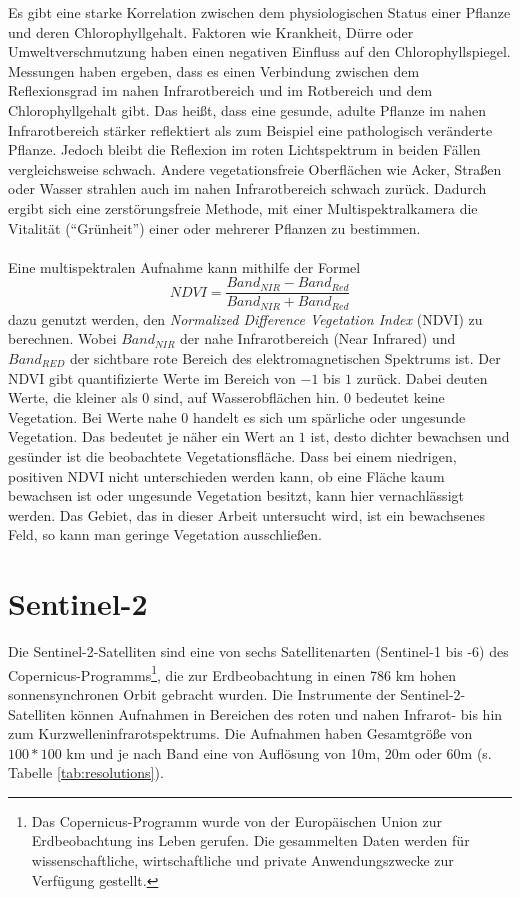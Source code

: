 Es gibt eine starke Korrelation zwischen dem physiologischen Status einer Pflanze und deren Chlorophyllgehalt. Faktoren wie Krankheit, Dürre oder Umweltverschmutzung haben einen negativen Einfluss auf den Chlorophyllspiegel.\cite{ref:hendry} Messungen haben ergeben, dass es einen Verbindung zwischen dem Reflexionsgrad im nahen Infrarotbereich und im Rotbereich und dem Chlorophyllgehalt gibt. Das heißt, dass eine gesunde, adulte Pflanze im nahen Infrarotbereich stärker reflektiert als zum Beispiel eine pathologisch veränderte Pflanze. Jedoch bleibt die Reflexion im roten Lichtspektrum in beiden Fällen vergleichsweise schwach. Andere vegetationsfreie Oberflächen wie Acker, Straßen oder Wasser strahlen auch im nahen Infrarotbereich schwach zurück. Dadurch ergibt sich eine zerstörungsfreie Methode, mit einer Multispektralkamera die Vitalität ("`Grünheit"') einer oder mehrerer Pflanzen zu bestimmen.\cite{ref:anatoly} \\\\
Eine multispektralen Aufnahme kann mithilfe der Formel 
\begin{equation}\label{equation:ndvi}
	NDVI = \frac{Band_{NIR} - Band_{Red}} {Band_{NIR} + Band_{Red}}
\end{equation}
dazu genutzt werden, den \textit{Normalized Difference Vegetation Index} (NDVI) zu berechnen. Wobei $Band_{NIR}$ der nahe Infrarotbereich (Near Infrared) und $Band_{RED}$ der sichtbare rote Bereich des elektromagnetischen Spektrums ist. Der NDVI gibt quantifizierte Werte im Bereich von $-1$ bis $1$ zurück. Dabei deuten Werte, die kleiner als $0$ sind, auf Wasserobflächen hin. $0$ bedeutet keine Vegetation. Bei Werte nahe $0$ handelt es sich um spärliche oder ungesunde Vegetation. Das bedeutet je näher ein Wert an $1$ ist, desto dichter bewachsen und gesünder ist die beobachtete Vegetationsfläche.\cite{ref:nasa} Dass bei einem niedrigen, positiven NDVI nicht unterschieden werden kann, ob eine Fläche kaum bewachsen ist oder ungesunde Vegetation besitzt, kann hier vernachlässigt werden. Das Gebiet, das in dieser Arbeit untersucht wird, ist ein bewachsenes Feld, so kann man geringe Vegetation ausschließen. 

\section{Sentinel-2}\label{sec:sentinel2}

Die Sentinel-2-Satelliten sind eine von sechs Satellitenarten (Sentinel-1 bis -6) des Copernicus-Programms\footnote{Das Copernicus-Programm wurde von der Europäischen Union zur Erdbeobachtung ins Leben gerufen. Die gesammelten Daten werden für wissenschaftliche, wirtschaftliche und private Anwendungszwecke zur Verfügung gestellt.\cite{ref:copernicus}}, die zur Erdbeobachtung in einen 786 km hohen sonnensynchronen Orbit gebracht wurden. Die Instrumente der Sentinel-2-Satelliten können Aufnahmen in Bereichen des roten und nahen Infrarot- bis hin zum Kurzwelleninfrarotspektrums. Die Aufnahmen haben Gesamtgröße von $100*100$ km und je nach Band eine von Auflösung von 10m, 20m oder 60m (s. Tabelle \ref{tab:resolutions}).

